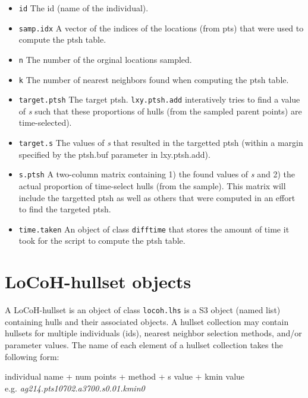 \documentclass{article}
\begin{document}
\begin{itemize}
    \begin{itemize}
      \item \texttt{id} The id (name of the individual).
      \item \texttt{samp.idx} A vector of the indices of the locations (from pts) that were used to compute the ptsh table.
      \item \texttt{n} The number of the orginal locations sampled.
      \item \texttt{k} The number of nearest neighbors found when computing the ptsh table.
      \item \texttt{target.ptsh} The target ptsh. \texttt{lxy.ptsh.add} interatively tries to find a value of \emph{s} such that these proportions of hulls (from the sampled parent points) are time-selected).
      \item \texttt{target.s}  The values of \emph{s} that resulted in the targetted ptsh (within a margin specified by the ptsh.buf parameter in lxy.ptsh.add).
      \item \texttt{s.ptsh} A two-column matrix containing 1) the found values of \emph{s} and 2) the actual proportion of time-select hulls (from the sample). This matrix will include the targetted ptsh as well as others that were computed in an effort to find the targeted ptsh.
      \item \texttt{time.taken} An object of class \texttt{difftime} that stores the amount of time it took for the script to compute the ptsh table.
    \end{itemize}  

\end{itemize}

\section*{LoCoH-hullset objects}

A LoCoH-hullset is an object of class \texttt{locoh.lhs} is a S3 object (named list) containing hulls and their associated objects. A hullset collection may contain hullsets for multiple individuals (ids), nearest neighbor selection methods, and/or parameter values. The name of each element of a hullset collection takes the following form:

\begin{center}
  individual name + num points + method + s value + kmin value\\
  e.g. \textit{ag214.pts10702.a3700.s0.01.kmin0}
\end{center}
\end{document}
